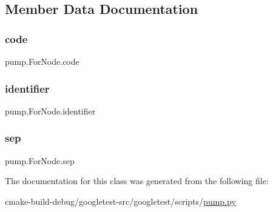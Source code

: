 \subsection{Member Data Documentation}
\mbox{\label{classpump_1_1ForNode_afdb5f4f2a3bc772bbc6ea777dfde898e}} 
\subsubsection{\texorpdfstring{code}{code}}
{\footnotesize\ttfamily pump.\+For\+Node.\+code}

\mbox{\label{classpump_1_1ForNode_a2444199e135e43696b3a006bd0d38982}} 
\subsubsection{\texorpdfstring{identifier}{identifier}}
{\footnotesize\ttfamily pump.\+For\+Node.\+identifier}

\mbox{\label{classpump_1_1ForNode_a06b493278b3c1ad53363a2bcc3b8efb3}} 
\subsubsection{\texorpdfstring{sep}{sep}}
{\footnotesize\ttfamily pump.\+For\+Node.\+sep}



The documentation for this class was generated from the following file\+:\begin{DoxyCompactItemize}
\item 
cmake-\/build-\/debug/googletest-\/src/googletest/scripts/\mbox{\hyperlink{pump_8py}{pump.\+py}}\end{DoxyCompactItemize}
